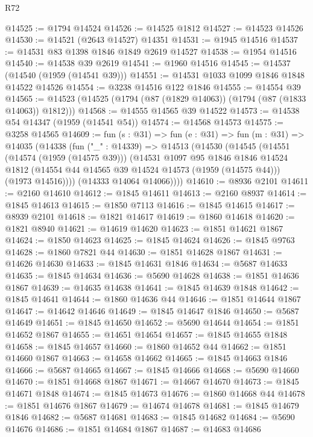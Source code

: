 \begin{lexlean}{R72}
\begin{coremodule}
@14525 := @1794 @14524
@14526 := @14525 @1812
@14527 := @14523 @14526
@14530 := @14521 (@2643 @14527) @14351
@14531 := @1945 @14516
@14537 := @14531 @83 @1398 @1846 @1849 @2619 @14527
@14538 := @1954 @14516
@14540 := @14538 @39 @2619
@14541 := @1960 @14516
@14545 := @14537 (@14540 (@1959 (@14541 @39)))
@14551 := @14531 @1033 @1099 @1846 @1848 @14522 @14526
@14554 := @3238 @14516 @122 @1846
@14555 := @14554 @39
@14565 := @14523 (@14525 (@1794 (@87 (@1829 @14063)) (@1794 (@87 (@1833 @14063)) @1812)))
@14568 := @14555 @14565 @39 @14522
@14573 := @14538 @54 @14347 (@1959 (@14541 @54))
@14574 := @14568 @14573
@14575 := @3258 @14565
@14609 := fun (s : @31) =>
  fun (e : @31) =>
  fun (m : @31) =>
  @14035
    (@14338
      (fun ("_" : @14339) =>
      @14513
        (@14530
          (@14545
            (@14551
              (@14574 (@1959 (@14575 @39)))
              (@14531
                @1097
                @95
                @1846
                @1846
                @14524
                @1812
                (@14554 @44 @14565 @39 @14524 @14573 (@1959 (@14575 @44)))
                (@1973 @14516))))
          (@14333 @14064 @14066))))
@14610 := @8936 @2101
@14611 := @2160 @14610
@14612 := @1845 @14611
@14613 := @2160 @8937
@14614 := @1845 @14613
@14615 := @1850 @7113
@14616 := @1845 @14615
@14617 := @8939 @2101
@14618 := @1821 @14617
@14619 := @1860 @14618
@14620 := @1821 @8940
@14621 := @14619 @14620
@14623 := @1851 @14621 @1867
@14624 := @1850 @14623
@14625 := @1845 @14624
@14626 := @1845 @9763
@14628 := @1860 @7821 @44
@14630 := @1851 @14628 @1867
@14631 := @14626 @14630
@14633 := @1845 @14631 @1846
@14634 := @5687 @14633
@14635 := @1845 @14634
@14636 := @5690 @14628
@14638 := @1851 @14636 @1867
@14639 := @14635 @14638
@14641 := @1845 @14639 @1848
@14642 := @1845 @14641
@14644 := @1860 @14636 @44
@14646 := @1851 @14644 @1867
@14647 := @14642 @14646
@14649 := @1845 @14647 @1846
@14650 := @5687 @14649
@14651 := @1845 @14650
@14652 := @5690 @14644
@14654 := @1851 @14652 @1867
@14655 := @14651 @14654
@14657 := @1845 @14655 @1848
@14658 := @1845 @14657
@14660 := @1860 @14652 @44
@14662 := @1851 @14660 @1867
@14663 := @14658 @14662
@14665 := @1845 @14663 @1846
@14666 := @5687 @14665
@14667 := @1845 @14666
@14668 := @5690 @14660
@14670 := @1851 @14668 @1867
@14671 := @14667 @14670
@14673 := @1845 @14671 @1848
@14674 := @1845 @14673
@14676 := @1860 @14668 @44
@14678 := @1851 @14676 @1867
@14679 := @14674 @14678
@14681 := @1845 @14679 @1846
@14682 := @5687 @14681
@14683 := @1845 @14682
@14684 := @5690 @14676
@14686 := @1851 @14684 @1867
@14687 := @14683 @14686

\end{coremodule}
\end{lexlean}
